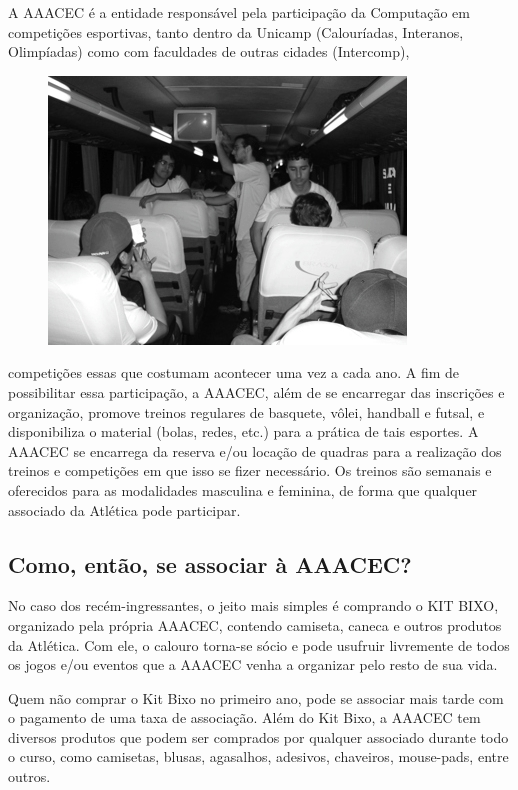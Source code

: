 A AAACEC é a entidade responsável pela participação da Computação em competições
esportivas, tanto dentro da Unicamp (Calouríadas, Interanos, Olimpíadas) como
com faculdades de outras cidades (Intercomp),
\begin{figure}[h!]
    \vspace{-10pt}
    \centering
    \includegraphics[scale=0.75, keepaspectratio=true]{img/imgs/20-aaacec/-096.jpg}
    \vspace{-10pt}
\end{figure}
competições essas que costumam
acontecer uma vez a cada ano. A fim de possibilitar essa participação, a AAACEC,
além de se encarregar das inscrições e organização, promove treinos regulares de
basquete, vôlei, handball e futsal, e disponibiliza o material (bolas, redes,
etc.) para a prática de tais esportes. A AAACEC se encarrega da reserva e/ou
locação de quadras para a realização dos treinos e competições em que isso se
fizer necessário. Os treinos são semanais e oferecidos para as modalidades
masculina e feminina, de forma que qualquer associado da Atlética pode
participar.

\subsection{Como, então, se associar à AAACEC?}

No caso dos recém-ingressantes, o jeito mais simples é comprando o KIT BIXO,
organizado pela própria AAACEC, contendo camiseta, caneca e outros produtos da
Atlética. Com ele, o calouro torna-se sócio e pode usufruir livremente de todos
os jogos e/ou eventos que a AAACEC venha a organizar pelo resto de sua vida.

Quem não comprar o Kit Bixo no primeiro ano, pode se associar mais tarde com o
pagamento de uma taxa de associação. Além do Kit Bixo, a AAACEC tem diversos
produtos que podem ser comprados por qualquer associado durante todo o curso,
como camisetas, blusas, agasalhos, adesivos, chaveiros, mouse-pads, entre
outros.

